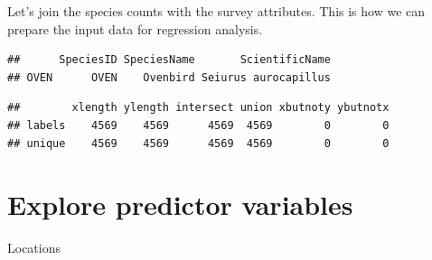 \documentclass[12pt,]{book}
\newenvironment{Shaded}{\begin{snugshade}}{\end{snugshade}}
\newcommand{\CommentTok}[1]{\textcolor[rgb]{0.56,0.35,0.01}{\textit{#1}}}
\newcommand{\KeywordTok}[1]{\textcolor[rgb]{0.13,0.29,0.53}{\textbf{#1}}}
\newcommand{\NormalTok}[1]{#1}
\newcommand{\OperatorTok}[1]{\textcolor[rgb]{0.81,0.36,0.00}{\textbf{#1}}}
\newcommand{\StringTok}[1]{\textcolor[rgb]{0.31,0.60,0.02}{#1}}
\begin{document}
Let's join the species counts with the survey attributes. This is how we can prepare the
input data for regression analysis.

\begin{Shaded}
\end{Shaded}

\begin{verbatim}
##      SpeciesID SpeciesName       ScientificName
## OVEN      OVEN    Ovenbird Seiurus aurocapillus
\end{verbatim}

\begin{Shaded}
\end{Shaded}

\begin{verbatim}
##        xlength ylength intersect union xbutnoty ybutnotx
## labels    4569    4569      4569  4569        0        0
## unique    4569    4569      4569  4569        0        0
\end{verbatim}

\begin{Shaded}
\end{Shaded}

\hypertarget{explore-predictor-variables}{%
\section{Explore predictor variables}\label{explore-predictor-variables}}

Locations
\end{document}
